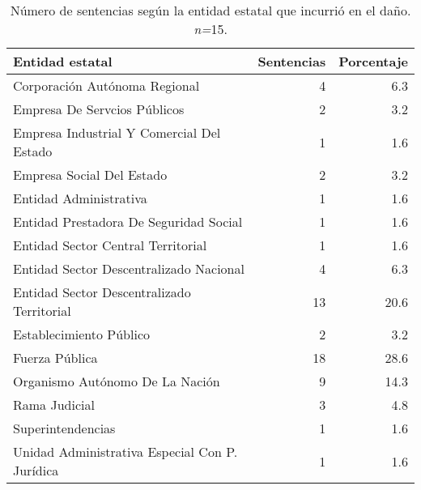 \begin{table}[H]
\centering
\caption{Número de sentencias según la entidad estatal que incurrió en el daño. \textit{n=}15.} 
\label{tab:entidad}
\begin{tabular}{lrr}
  \hline
Entidad estatal & Sentencias & Porcentaje \\ 
  \hline
Corporación Autónoma Regional &  4 & 6.3 \\ 
  Empresa De Servcios Públicos &  2 & 3.2 \\ 
  Empresa Industrial Y Comercial Del Estado &  1 & 1.6 \\ 
  Empresa Social Del Estado &  2 & 3.2 \\ 
  Entidad Administrativa &  1 & 1.6 \\ 
  Entidad Prestadora De Seguridad Social &  1 & 1.6 \\ 
  Entidad Sector Central Territorial &  1 & 1.6 \\ 
  Entidad Sector Descentralizado Nacional &  4 & 6.3 \\ 
  Entidad Sector Descentralizado Territorial & 13 & 20.6 \\ 
  Establecimiento Público &  2 & 3.2 \\ 
  Fuerza Pública & 18 & 28.6 \\ 
  Organismo Autónomo De La Nación &  9 & 14.3 \\ 
  Rama Judicial &  3 & 4.8 \\ 
  Superintendencias &  1 & 1.6 \\ 
  Unidad Administrativa Especial Con P. Jurídica &  1 & 1.6 \\ 
   \hline
\end{tabular}
\end{table}
